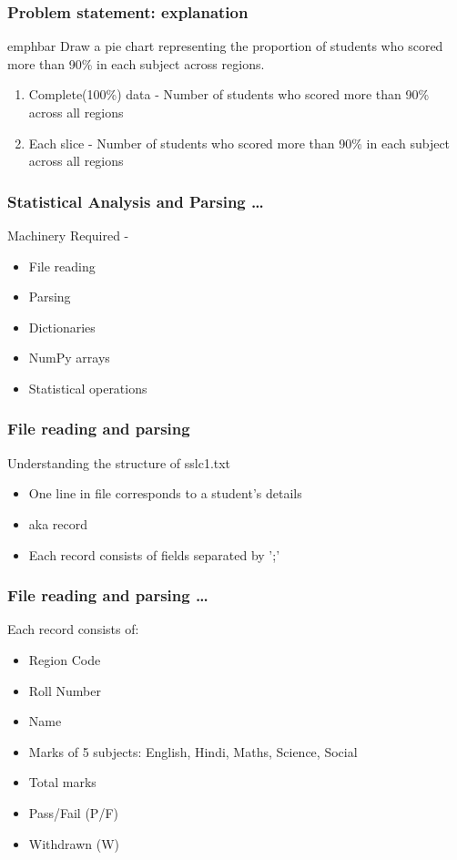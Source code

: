 \documentclass[14pt,compress]{beamer}
\newcommand{\emphbar}[1]
{\begin{beamercolorbox}[rounded=true]{emphbar} 
      {#1}
 \end{beamercolorbox}
}
\newcounter{time}
\newcommand{\inctime}[1]{\addtocounter{time}{#1}{\tiny \thetime\ m}}
\begin{document}
\begin{frame}
  \frametitle{Problem statement: explanation}
    \emphbar{Draw a pie chart representing the proportion of students who scored more than 90\% in each subject across regions.}
    \begin{enumerate}
      \item Complete(100\%) data - Number of students who scored more than 90\% across all regions
      \item Each slice - Number of students who scored more than 90\% in each subject across all regions
    \end{enumerate}
\end{frame}

\begin{frame}
  \frametitle{Statistical Analysis and Parsing \ldots}
  Machinery Required -
  \begin{itemize}
    \item File reading
    \item Parsing
    \item Dictionaries
    \item NumPy arrays
    \item Statistical operations
  \end{itemize}
\end{frame}

\begin{frame}
  \frametitle{File reading and parsing}
  Understanding the structure of sslc1.txt
  \begin{itemize}
    \item One line in file corresponds to a student's details
    \item aka record
    \item Each record consists of fields separated by ';'
  \end{itemize}
\end{frame}

\begin{frame}
  \frametitle{File reading and parsing \ldots}
  Each record consists of:
  \begin{itemize}
    \item Region Code
    \item Roll Number
    \item Name
    \item Marks of 5 subjects: English, Hindi, Maths, Science, Social
    \item Total marks
    \item Pass/Fail (P/F)
    \item Withdrawn (W)
  \end{itemize}
  \inctime{5}
\end{frame}
\end{document}
